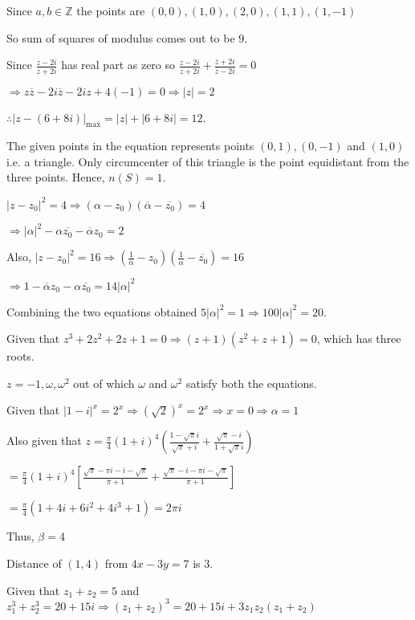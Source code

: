   Since $a, b\in\mathbb{Z}$ the points are $(0, 0), (1, 0), (2, 0), (1, 1), (1, -1)$

  So sum of squares of modulus comes out to be $9$.
\item Since $\frac{z - 2i}{z + 2i}$ has real part as zero so $\frac{z - 2i}{z + 2i} + \frac{\overline{z} +
  2i}{\overline{z} - 2i} = 0$

  $\Rightarrow z\overline{z} - 2i\overline{z} - 2iz + 4(-1) = 0\Rightarrow |z| = 2$

  $\therefore |z - (6 + 8i)|_{\max} = |z| + |6 + 8i| = 12$.
\item The given points in the equation represents points $(0, 1), (0, -1)$ and $(1, 0)$ i.e. a
  triangle. Only circumcenter of this triangle is the point equidistant from the three points. Hence, $n(S)
  = 1$.
\item $|z - z_0|^2 = 4\Rightarrow \left(\alpha - z_0\right)\left(\overline{\alpha} - \overline{z_0}\right) =
  4$

  $\Rightarrow |\alpha|^2 - \alpha\overline{z_0} - \overline{\alpha}z_0 = 2$

  Also, $|z - z_0|^2 = 16 \Rightarrow \left(\frac{1}{\overline{\alpha}} - z_0\right)\left(\frac{1}{\alpha}
  - \overline{z_0}\right) = 16$

  $\Rightarrow 1 - \overline{\alpha}z_0 - \alpha\overline{z_0} = 14|\alpha|^2$

  Combining the two equations obtained $5|\alpha|^2 = 1\Rightarrow 100|\alpha|^2 = 20$.
\item Given that $z^3 + 2z^2 + 2z + 1 = 0 \Rightarrow (z + 1)(z^2 + z + 1) = 0$, which has three roots.

  $z = -1, \omega, \omega^2$ out of which $\omega$ and $\omega^2$ satisfy both the equations.
\item Given that $|1 - i|^x = 2^x \Rightarrow \left(\sqrt{2}\right)^x = 2^x\Rightarrow x =
  0 \Rightarrow \alpha = 1$

  Also given that $z = \frac{\pi}{4}(1 + i)^4\left(\frac{1 - \sqrt{\pi}i}{\sqrt{\pi} + i} + \frac{\sqrt{\pi}
    - i}{1 + \sqrt{\pi}i}\right)$

  $= \frac{\pi}{4}(1 + i)^4\left[\frac{\sqrt{\pi} - \pi i - i - \sqrt{\pi}}{\pi + 1} + \frac{\sqrt{\pi} - i
      - \pi i-\sqrt{\pi}}{\pi + 1}\right]$

  $= \frac{\pi}{4}\left(1 + 4i + 6i^2 + 4i^3 + 1\right) = 2\pi i$

  Thus, $\beta = 4$

  Distance of $(1, 4)$ from $4x - 3y = 7$ is $3$.
\item Given that $z_1 + z_2 = 5$ and $z_1^3 + z_2^3 = 20 + 15i\Rightarrow (z_1 + z_2)^3 = 20 + 15i +
  3z_1z_2(z_1 + z_2)$

